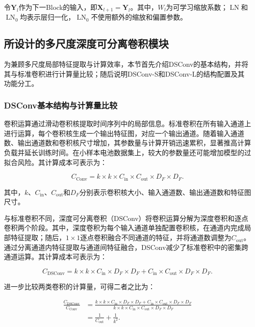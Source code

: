 令$\mathbf Y_l$作为下一Block的输入，即$\mathbf X_{l+1}=\mathbf Y_l$。其中，$W_l$为可学习缩放系数；$\operatorname{LN}$和$\operatorname{LN}_0$均表示层归一化，$\operatorname{LN}_0$不使用额外的缩放和偏置参数。



\subsection{所设计的多尺度深度可分离卷积模块}

为兼顾多尺度局部特征提取与计算效率，本节首先介绍DSConv的基本结构，并将其与标准卷积进行计算量比较；随后说明DSConv-S和DSConv-L的结构配置及其功能分工。


\subsubsection{DSConv基本结构与计算量比较}

卷积运算通过滑动卷积核提取时间序列中的局部信息\cite{ref71}。标准卷积在所有输入通道上进行运算，每个卷积核生成一个输出特征图，对应一个输出通道。随着输入通道数、输出通道数和卷积核尺寸增加，其参数量与计算开销迅速累积，显著推高计算负载并延长训练时间。在小样本电池数据集上，较大的参数量还可能增加模型的过拟合风险。其计算成本可表示为：

\begin{equation}
C_{\mathrm{Conv}}
=
k\times k\times C_{\mathrm{in}}\times C_{\mathrm{out}}\times D_F\times D_F.
\label{eq:conv_cost}
\end{equation}

其中，$k$、$C_{\mathrm{in}}$、$C_{\mathrm{out}}$和$D_F$分别表示卷积核大小、输入通道数、输出通道数和特征图尺寸。

与标准卷积不同，深度可分离卷积（DSConv）将卷积运算分解为深度卷积和逐点卷积两个阶段\cite{ref71}。其中，深度卷积为每个输入通道单独配置卷积核，在通道内完成局部特征提取；随后，$1\times1$逐点卷积融合不同通道的特征，并将通道数调整为$C_{\mathrm{out}}$。通过分离通道内特征提取与通道间特征融合，DSConv减少了标准卷积中的密集跨通道运算。其计算成本可表示为：

\begin{equation}
C_{\mathrm{DSConv}}
=
k\times k\times C_{\mathrm{in}}\times D_F\times D_F
+
C_{\mathrm{in}}\times C_{\mathrm{out}}\times D_F\times D_F.
\label{eq:dsconv_cost}
\end{equation}

进一步比较两类卷积的计算量，可得二者之比为：

\begin{equation}
\begin{aligned}
\frac{C_{\mathrm{DSConv}}}{C_{\mathrm{Conv}}}
&=
\frac{
k\times k\times C_{\mathrm{in}}\times D_F\times D_F
+
C_{\mathrm{in}}\times C_{\mathrm{out}}\times D_F\times D_F
}{
k\times k\times C_{\mathrm{in}}\times C_{\mathrm{out}}\times D_F\times D_F
} \\
&=
\frac{1}{C_{\mathrm{out}}}
+
\frac{1}{k^2}.
\end{aligned}
\label{eq:dsconv_cost_ratio}
\end{equation}

